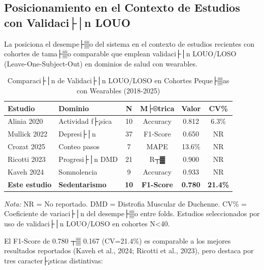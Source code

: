 \subsection{Posicionamiento en el Contexto de Estudios con Validaci├│n LOUO}
\label{subsec:comparativa_louo}

La  posiciona el desempe├▒o del sistema en el contexto de estudios recientes con cohortes de tama├▒o comparable que emplean validaci├│n LOUO/LOSO (Leave-One-Subject-Out) en dominios de salud con wearables.

\begin{table}[htbp]
\centering
\caption{Comparaci├│n de Validaci├│n LOUO/LOSO en Cohortes Peque├▒as con Wearables (2018-2025)}
\label{tab:comparativa_louo}
\small
\begin{tabular}{@{}llcccc@{}}
\toprule
\textbf{Estudio} & \textbf{Dominio} & \textbf{N} & \textbf{M├®trica} & \textbf{Valor} & \textbf{CV\%} \\
\midrule
Alinia 2020 & Actividad f├¡sica & 10 & Accuracy & 0.812 & 6.3\% \\
Mullick 2022 & Depresi├│n & 37 & F1-Score & 0.650 & NR \\
Crozat 2025 & Conteo pasos & 7 & MAPE & 13.6\% & NR \\
Ricotti 2023 & Progresi├│n DMD & 21 & R┬▓ & 0.900 & NR \\
Kaveh 2024 & Somnolencia & 9 & Accuracy & 0.933 & NR \\
\midrule
\textbf{Este estudio} & \textbf{Sedentarismo} & \textbf{10} & \textbf{F1-Score} & \textbf{0.780} & \textbf{21.4\%} \\
\bottomrule
\end{tabular}
\begin{flushleft}
\scriptsize
\textit{Nota:} NR = No reportado. DMD = Distrofia Muscular de Duchenne. CV\% = Coeficiente de variaci├│n del desempe├▒o entre folds. Estudios seleccionados por uso de validaci├│n LOUO/LOSO en cohortes N<40.
\end{flushleft}
\end{table}

El F1-Score de 0.780 ┬▒ 0.167 (CV=21.4\%) es comparable a los mejores resultados reportados (Kaveh et al., 2024; Ricotti et al., 2023), pero destaca por tres caracter├¡sticas distintivas:

